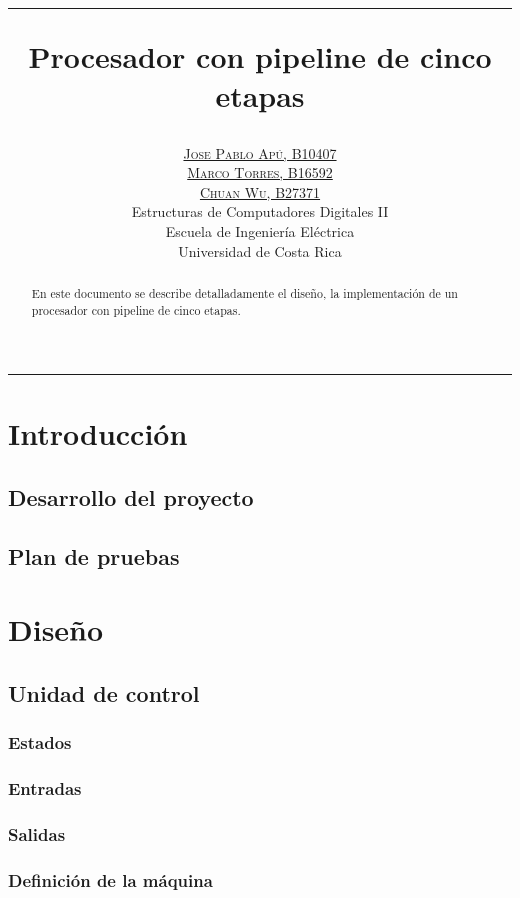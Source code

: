 \documentclass[paper=letter, fontsize=12pt]{article}
\title{\vspace{-20mm}\hrule\vspace{5mm}\fontsize{24pt}{10pt}\selectfont\textbf{Procesador con pipeline de cinco etapas}} %
\author{
\large
\href{mailto:josepabloapu@gmail.com}{\textsc{Jose Pablo Apú, B10407}}\\\href{mailto:marco.torres.810@gmail.com}{\textsc{Marco Torres, B16592}}\\\href{mailto:}{\textsc{Chuan Wu, B27371}} \\[2mm]
\normalsize Estructuras de Computadores Digitales II \\[1mm] %
\normalsize Escuela de Ingeniería Eléctrica \\ %
\normalsize Universidad de Costa Rica \\ %
}
\date{}
\begin{document}
\maketitle 
\hrule
\begin{abstract}
En este documento se describe detalladamente el diseño, la implementación de un procesador con pipeline de cinco etapas.   
\end{abstract}

\section{Introducción}

\subsection{Desarrollo del proyecto}

\subsection{Plan de pruebas}

\section{Diseño}

\subsection{Unidad de control}

\subsubsection{Estados}

\subsubsection{Entradas}

\subsubsection{Salidas}

\pagebreak
\subsubsection{Definición de la máquina}
\end{document}
